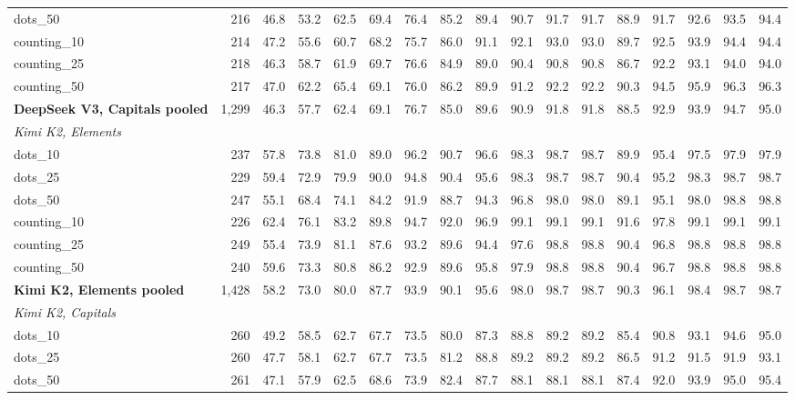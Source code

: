 \begin{table}[h]
\begin{tabular}{l r r r r r r r r r r r r r r r r}
dots\_50 & 216 & 46.8 & 53.2 & 62.5 & 69.4 & 76.4 & 85.2 & 89.4 & 90.7 & 91.7 & 91.7 & 88.9 & 91.7 & 92.6 & 93.5 & 94.4 \\
counting\_10 & 214 & 47.2 & 55.6 & 60.7 & 68.2 & 75.7 & 86.0 & 91.1 & 92.1 & 93.0 & 93.0 & 89.7 & 92.5 & 93.9 & 94.4 & 94.4 \\
counting\_25 & 218 & 46.3 & 58.7 & 61.9 & 69.7 & 76.6 & 84.9 & 89.0 & 90.4 & 90.8 & 90.8 & 86.7 & 92.2 & 93.1 & 94.0 & 94.0 \\
counting\_50 & 217 & 47.0 & 62.2 & 65.4 & 69.1 & 76.0 & 86.2 & 89.9 & 91.2 & 92.2 & 92.2 & 90.3 & 94.5 & 95.9 & 96.3 & 96.3 \\
\addlinespace[2pt]
\textbf{DeepSeek V3, Capitals pooled} & 1,299 & 46.3 & 57.7 & 62.4 & 69.1 & 76.7 & 85.0 & 89.6 & 90.9 & 91.8 & 91.8 & 88.5 & 92.9 & 93.9 & 94.7 & 95.0 \\
\multicolumn{17}{l}{\textit{Kimi K2, Elements}} \\
dots\_10 & 237 & 57.8 & 73.8 & 81.0 & 89.0 & 96.2 & 90.7 & 96.6 & 98.3 & 98.7 & 98.7 & 89.9 & 95.4 & 97.5 & 97.9 & 97.9 \\
dots\_25 & 229 & 59.4 & 72.9 & 79.9 & 90.0 & 94.8 & 90.4 & 95.6 & 98.3 & 98.7 & 98.7 & 90.4 & 95.2 & 98.3 & 98.7 & 98.7 \\
dots\_50 & 247 & 55.1 & 68.4 & 74.1 & 84.2 & 91.9 & 88.7 & 94.3 & 96.8 & 98.0 & 98.0 & 89.1 & 95.1 & 98.0 & 98.8 & 98.8 \\
counting\_10 & 226 & 62.4 & 76.1 & 83.2 & 89.8 & 94.7 & 92.0 & 96.9 & 99.1 & 99.1 & 99.1 & 91.6 & 97.8 & 99.1 & 99.1 & 99.1 \\
counting\_25 & 249 & 55.4 & 73.9 & 81.1 & 87.6 & 93.2 & 89.6 & 94.4 & 97.6 & 98.8 & 98.8 & 90.4 & 96.8 & 98.8 & 98.8 & 98.8 \\
counting\_50 & 240 & 59.6 & 73.3 & 80.8 & 86.2 & 92.9 & 89.6 & 95.8 & 97.9 & 98.8 & 98.8 & 90.4 & 96.7 & 98.8 & 98.8 & 98.8 \\
\addlinespace[2pt]
\textbf{Kimi K2, Elements pooled} & 1,428 & 58.2 & 73.0 & 80.0 & 87.7 & 93.9 & 90.1 & 95.6 & 98.0 & 98.7 & 98.7 & 90.3 & 96.1 & 98.4 & 98.7 & 98.7 \\
\multicolumn{17}{l}{\textit{Kimi K2, Capitals}} \\
dots\_10 & 260 & 49.2 & 58.5 & 62.7 & 67.7 & 73.5 & 80.0 & 87.3 & 88.8 & 89.2 & 89.2 & 85.4 & 90.8 & 93.1 & 94.6 & 95.0 \\
dots\_25 & 260 & 47.7 & 58.1 & 62.7 & 67.7 & 73.5 & 81.2 & 88.8 & 89.2 & 89.2 & 89.2 & 86.5 & 91.2 & 91.5 & 91.9 & 93.1 \\
dots\_50 & 261 & 47.1 & 57.9 & 62.5 & 68.6 & 73.9 & 82.4 & 87.7 & 88.1 & 88.1 & 88.1 & 87.4 & 92.0 & 93.9 & 95.0 & 95.4 \\

\end{tabular}
\end{table}

